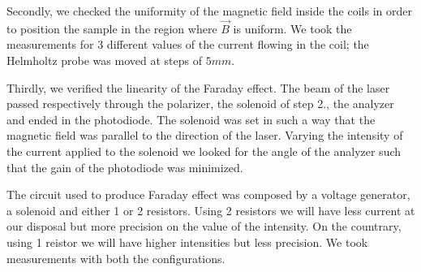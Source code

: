 \documentclass[•]{article}
\begin{document}
Secondly, we checked the uniformity of the magnetic field inside the coils in order to position the sample in the region where $\vec{B}$ is uniform. We took the measurements for 3 different values of the current flowing in the coil; the Helmholtz probe was moved at steps of $5mm$.

Thirdly, we verified the linearity of the Faraday effect. The beam of the laser passed respectively through the polarizer, the solenoid of step 2., the analyzer and ended in the photodiode. The solenoid was set in such a way that the magnetic field was parallel to the direction of the laser. Varying the intensity of the current applied to the solenoid we looked for the angle of the analyzer such that the gain of the photodiode was minimized.

The circuit used to produce Faraday effect was composed by a voltage generator, a solenoid and either 1 or 2 resistors. Using 2 resistors we will have less current at our disposal but more precision on the value of the intensity. On the countrary, using 1 reistor we will have higher intensities but less precision. We took measurements with both the configurations.

\newpage


\end{document}
